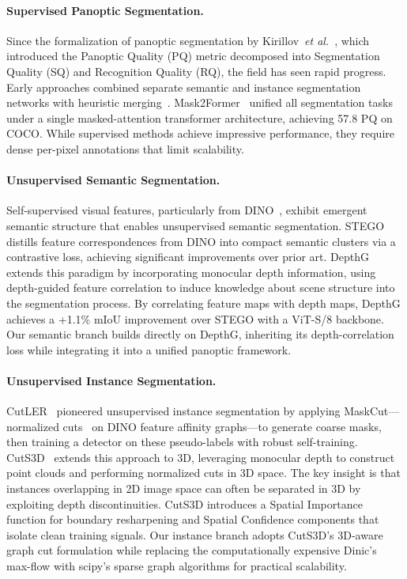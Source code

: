 \documentclass{article}
\newcommand{\etal}{\emph{et al.}}
\begin{document}
\paragraph{Supervised Panoptic Segmentation.}
Since the formalization of panoptic segmentation by Kirillov~\etal~\cite{kirillov2019panoptic}, which introduced the Panoptic Quality (PQ) metric decomposed into Segmentation Quality (SQ) and Recognition Quality (RQ), the field has seen rapid progress. Early approaches combined separate semantic and instance segmentation networks with heuristic merging~\cite{kirillov2019panopticfpn}. Mask2Former~\cite{cheng2022mask2former} unified all segmentation tasks under a single masked-attention transformer architecture, achieving 57.8 PQ on COCO. While supervised methods achieve impressive performance, they require dense per-pixel annotations that limit scalability.

\paragraph{Unsupervised Semantic Segmentation.}
Self-supervised visual features, particularly from DINO~\cite{caron2021dino}, exhibit emergent semantic structure that enables unsupervised semantic segmentation. STEGO~\cite{hamilton2022stego} distills feature correspondences from DINO into compact semantic clusters via a contrastive loss, achieving significant improvements over prior art. DepthG~\cite{sick2024depthg} extends this paradigm by incorporating monocular depth information, using depth-guided feature correlation to induce knowledge about scene structure into the segmentation process. By correlating feature maps with depth maps, DepthG achieves a +1.1\% mIoU improvement over STEGO with a ViT-S/8 backbone. Our semantic branch builds directly on DepthG, inheriting its depth-correlation loss while integrating it into a unified panoptic framework.

\paragraph{Unsupervised Instance Segmentation.}
CutLER~\cite{wang2023cutler} pioneered unsupervised instance segmentation by applying MaskCut---normalized cuts~\cite{shi2000ncut} on DINO feature affinity graphs---to generate coarse masks, then training a detector on these pseudo-labels with robust self-training. CutS3D~\cite{sick2025cuts3d} extends this approach to 3D, leveraging monocular depth to construct point clouds and performing normalized cuts in 3D space. The key insight is that instances overlapping in 2D image space can often be separated in 3D by exploiting depth discontinuities. CutS3D introduces a Spatial Importance function for boundary resharpening and Spatial Confidence components that isolate clean training signals. Our instance branch adopts CutS3D's 3D-aware graph cut formulation while replacing the computationally expensive Dinic's max-flow with scipy's sparse graph algorithms for practical scalability.
\end{document}
